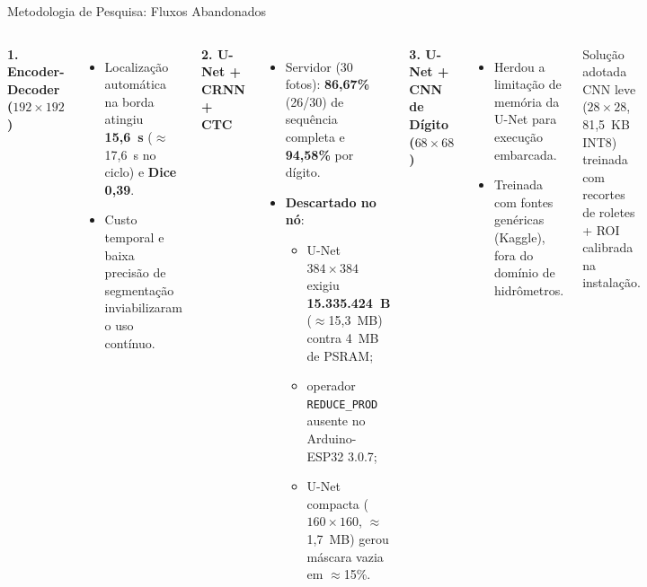 \documentclass[
    aspectratio=169,
    11pt,
    brazil
]{beamer}
\begin{document}
\begin{frame}{Metodologia de Pesquisa: Fluxos Abandonados}
  \begin{columns}[t]
    {\scriptsize\bfseries\color{senacblue}1. Encoder-Decoder ($192\times192$)}
    \begin{itemize}\tiny
      \setlength{\itemsep}{2pt}
      \item Localização automática na borda atingiu \textbf{15,6~s} ($\approx$17,6~s no ciclo) e \textbf{Dice 0,39}.
      \item Custo temporal e baixa precisão de segmentação inviabilizaram o uso contínuo.
    \end{itemize}

    {\scriptsize\bfseries\color{senacblue}2. U-Net + CRNN + CTC}
    \begin{itemize}\tiny
      \setlength{\itemsep}{2pt}
      \item Servidor (30 fotos): \textbf{86,67\%} (26/30) de sequência completa e \textbf{94,58\%} por dígito.
      \item \textbf{Descartado no nó}:
        \begin{itemize}\tiny
          \item U-Net $384\times384$ exigiu \textbf{15.335.424~B} ($\approx$15,3~MB) contra 4~MB de PSRAM;
          \item operador \texttt{REDUCE\_PROD} ausente no Arduino-ESP32 3.0.7;
          \item U-Net compacta ($160\times160$, $\approx$1,7~MB) gerou máscara vazia em $\approx$15\%.
        \end{itemize}
    \end{itemize}

    {\scriptsize\bfseries\color{senacblue}3. U-Net + CNN de Dígito ($68\times68$)}
    \begin{itemize}\tiny
      \setlength{\itemsep}{2pt}
      \item Herdou a limitação de memória da U-Net para execução embarcada.
      \item Treinada com fontes genéricas (Kaggle), fora do domínio de hidrômetros.
    \end{itemize}
    \vspace{0.12cm}
    \begin{block}{Solução adotada}
      \tiny CNN leve ($28\times28$, 81,5~KB INT8) treinada com recortes de roletes + ROI calibrada na instalação.
    \end{block}
  \end{columns}
\end{frame}
\end{document}
